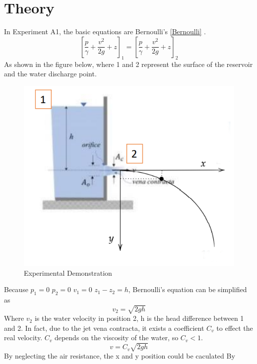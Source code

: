 \section{Theory}
In Experiment A1, the basic equations are Bernoulli's \eqref{Bernoulli} .
\begin{equation}
\label{Bernoulli}
\left[ \frac{p}{\gamma}+\frac{v^2}{2g}+z \right]_1 = 
\left[ \frac{p}{\gamma}+\frac{v^2}{2g}+z \right]_2 
\end{equation}
As shown in the figure below, where 1 and 2 represent the surface of 
the reservoir and the water discharge point.
\begin{figure}[htb] %
    \centering
    \includegraphics[scale=0.45]{Theory/figures/figure1.png}
    \caption{Experimental Demonstration}
    \label{fig:demo}
\end{figure}
Because $p_1=0$ $p_2=0$ $v_1=0$ $z_1-z_2=h$, Bernoulli's equation can be simplified as
\begin{equation}
v_2=\sqrt{2gh}
\label{1}
\end{equation}
Where $v_2$ is the water velocity in position 2, h is the head difference between 1 and 2.
In fact, due to the jet vena contracta, it exists a coefficient $C_v$ to effect the real velocity.
$C_v$ depends on the viscosity of the water, so $C_v < 1$.
\begin{equation}
    v=C_v\sqrt{2gh}
    \label{2}
\end{equation}
By neglecting the air resistance, the x and y position could be caculated By

